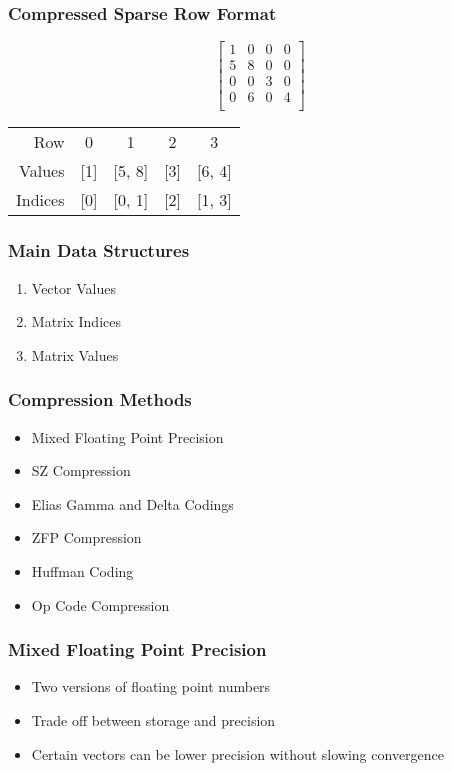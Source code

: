 \documentclass{beamer}
\begin{document}
\begin{frame}
	\frametitle{Compressed Sparse Row Format}
	\centering
	\[
		\begin{bmatrix}
		1 & 0 & 0 & 0 \\
		5 & 8 & 0 & 0 \\
		0 & 0 & 3 & 0 \\
		0 & 6 & 0 & 4 \\
		\end{bmatrix}
	\]
	\begin{tabular}{rcccc}
	Row     & 0 & 1 & 2 & 3 \\
	Values  & [1] & [5, 8] & [3] & [6, 4] \\
	Indices & [0] & [0, 1] & [2] & [1, 3] \\
	\end{tabular}
\end{frame}
\begin{frame}
	\frametitle{Main Data Structures}
	\begin{enumerate}
		\item Vector Values
		\item Matrix Indices
		\item Matrix Values
	\end{enumerate}
\end{frame}

\begin{frame}
	\frametitle{Compression Methods}
	\begin{itemize}
		\item<1-2> Mixed Floating Point Precision
		\item<1-2> SZ Compression
		\item<1-2> Elias Gamma and Delta Codings
		\item<1> ZFP Compression
		\item<1> Huffman Coding
		\item<1> Op Code Compression
	\end{itemize}
\end{frame}

\begin{frame}
	\frametitle{Mixed Floating Point Precision}
	\begin{itemize}
		\item Two versions of floating point numbers
		\item Trade off between storage and precision
		\item Certain vectors can be lower precision without slowing convergence
	\end{itemize}
\end{frame}
\end{document}
